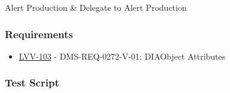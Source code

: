Alert Production \& Delegate to Alert Production

\hypertarget{requirements-142}{%
\subsubsection{Requirements}\label{requirements-142}}

\begin{itemize}
\tightlist
\item
  \href{https://jira.lsstcorp.org/browse/LVV-103}{LVV-103} -
  DMS-REQ-0272-V-01: DIAObject Attributes
\end{itemize}

\hypertarget{test-script-142}{%
\subsubsection{Test Script}\label{test-script-142}}

